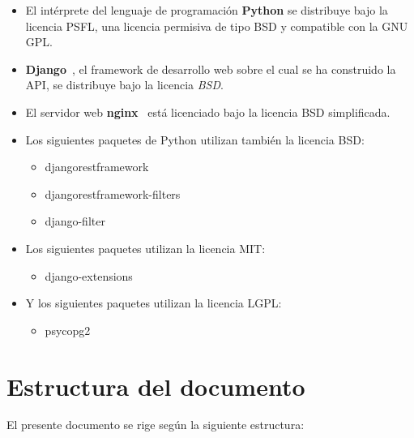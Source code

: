 \begin{itemize}
\item El intérprete del lenguaje de programación \textbf{Python} se distribuye
  bajo la licencia \ac{PSFL}, una licencia permisiva de tipo \ac{BSD} y
  compatible con la \ac{GNU} \ac{GPL}.

\item \textbf{Django}~\cite{django:mvc}, el framework de desarrollo web sobre el
  cual se ha construido la API, se distribuye bajo la licencia \textit{\ac{BSD}}.

\item El servidor web \textbf{nginx}~\cite{nginx} está licenciado bajo la
  licencia \ac{BSD} simplificada.

\item Los siguientes paquetes de Python utilizan también la licencia \ac{BSD}:
  \begin{itemize}
  \item djangorestframework
  \item djangorestframework-filters
  \item django-filter
  \end{itemize}

\item Los siguientes paquetes utilizan la licencia \ac{MIT}:
  \begin{itemize}
  \item django-extensions
  \end{itemize}

\item Y los siguientes paquetes utilizan la licencia \ac{LGPL}:
  \begin{itemize}
  \item psycopg2
  \end{itemize}

\end{itemize}

\section{Estructura del documento}
El presente documento se rige según la siguiente estructura:

